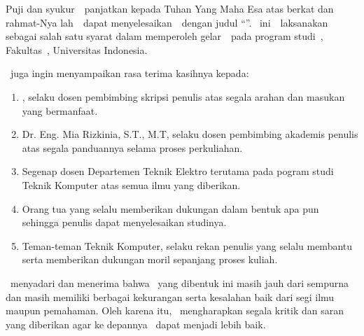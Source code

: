 \vspace*{4\baselineskip}
Puji dan syukur~\saya~panjatkan kepada Tuhan Yang Maha Esa atas berkat dan rahmat-Nya lah~\saya~dapat menyelesaikan~\type~dengan judul ``\judul''. \type~ini~\saya~laksanakan sebagai salah satu syarat dalam memperoleh gelar~\gelar~pada program studi~\program, Fakultas~\fakultas, Universitas Indonesia.

\saya\ juga ingin menyampaikan rasa terima kasihnya kepada:
\begin{enumerate}
    \item \pembimbing, selaku dosen pembimbing skripsi penulis atas segala arahan dan masukan yang bermanfaat.
    \item Dr. Eng. Mia Rizkinia, S.T., M.T, selaku dosen pembimbing akademis penulis atas segala panduannya selama proses perkuliahan.
    \item Segenap dosen Departemen Teknik Elektro terutama pada pogram studi Teknik Komputer atas semua ilmu yang diberikan.
    \item Orang tua yang selalu memberikan dukungan dalam bentuk apa pun sehingga penulis dapat menyelesaikan studinya.
    \item Teman-teman Teknik Komputer, selaku rekan penulis yang selalu membantu serta memberikan dukungan moril sepanjang proses kuliah.
\end{enumerate}
\saya\ menyadari dan menerima bahwa \type\ yang dibentuk ini masih jauh dari sempurna dan masih memiliki berbagai kekurangan serta kesalahan baik dari segi ilmu maupun pemahaman. Oleh karena itu, \saya\ mengharapkan segala kritik dan saran yang diberikan agar ke depannya \saya\ dapat menjadi lebih baik.

\vspace*{0.1cm}
\begin{flushright}
\tanggalPengesahan\\[0.1cm]
\vspace*{2cm}
\penulis

\end{flushright}
